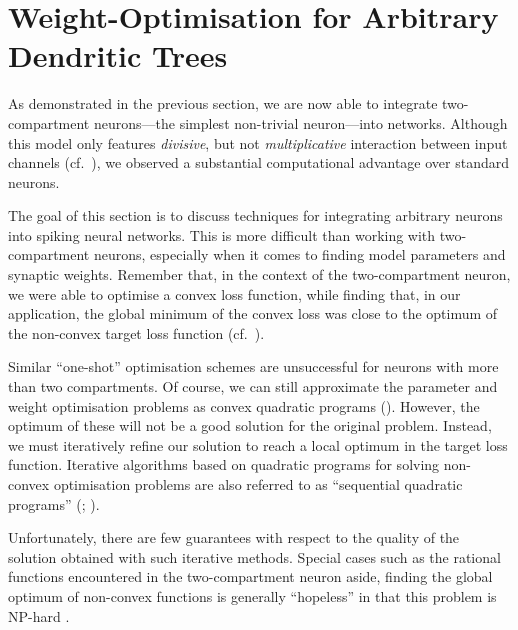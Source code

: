 
\section{Weight-Optimisation for Arbitrary Dendritic Trees}
\label{sec:nlif_opt}

As demonstrated in the previous section, we are now able to integrate two-compartment \LIF neurons---the simplest non-trivial \nlif neuron---into \NEF networks.
Although this model only features \emph{divisive}, but not \emph{multiplicative} interaction between input channels (cf.~), we observed a substantial computational advantage over standard \LIF neurons.

The goal of this section is to discuss techniques for integrating arbitrary \nlif neurons into spiking neural networks.
This is more difficult than working with two-compartment \LIF neurons, especially when it comes to finding model parameters and synaptic weights.
Remember that, in the context of the two-compartment \LIF neuron, we were able to optimise a convex loss function, while finding that, in our application, the global minimum of the convex loss was close to the optimum of the non-convex target loss function (cf.~).

Similar \enquote{one-shot} optimisation schemes are unsuccessful for \nlif neurons with more than two compartments.
Of course, we can still approximate the parameter and weight optimisation problems as convex quadratic programs (\QPpl).
However, the optimum of these \QPpl will not be a good solution for the original problem.
Instead, we must iteratively refine our solution to reach a local optimum in the target loss function.
Iterative algorithms based on quadratic programs for solving non-convex optimisation problems are also referred to as \enquote{sequential quadratic programs} (\SQPpl; \cite[e.g.,][Chapter~18]{nocedal2006numerical}).

Unfortunately, there are few guarantees with respect to the quality of the solution obtained with such iterative methods.
Special cases such as the rational functions encountered in the two-compartment \LIF neuron aside, finding the global optimum of non-convex functions is generally \enquote{hopeless} in that this problem is NP-hard \citep[e.g.,]{sun2016when}.


